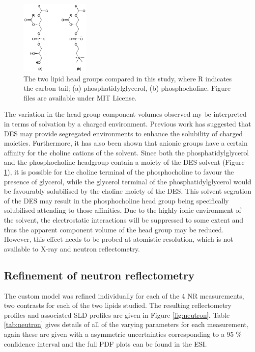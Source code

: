\documentclass[twoside,twocolumn,9pt]{article}
\begin{document}
\begin{figure}
	\centering
	\includegraphics[width=0.30\textwidth]{figures/head_groups}
	\caption{The two lipid head groups compared in this study, where R indicates the carbon tail; (a) phosphatidylglycerol, (b) phosphocholine. Figure files are available under MIT License.\cite{mccluskey_2018}}
	\label{fig:heads}
\end{figure}

The variation in the head group component volumes observed my be interpreted in terms of solvation by a charged environment. Previous work has suggested that DES may provide segregated environments to enhance the solubility of charged moieties.\cite{Bryant2017,Bryant2016,Sanchez-Fernandez2018} Furthermore, it has also been shown that anionic groups have a certain affinity for the choline cations of the solvent.\cite{Sanchez-Fernandez2016} Since both the phosphatidylglycerol and the phosphocholine headgroup contain a moiety of the DES solvent (Figure \ref{fig:heads}), it is possible for the choline terminal of the phosphocholine to favour the presence of glycerol, while the glycerol terminal of the phosphatidylglycerol would be favourably solubilised by the choline moiety of the DES. This solvent segration of the DES may result in the phosphocholine head group being specifically solubilised attending to those affinities. Due to the highly ionic environment of the solvent, the electrostatic interactions will be suppressed to some extent and thus the apparent component volume of the head group may be reduced. However, this effect needs to be probed at atomistic resolution, which is not available to X-ray and neutron reflectometry.

\subsection{Refinement of neutron reflectometry}
The custom model was refined individually for each of the 4 NR measurements, two contrasts for each of the two lipids studied. The resulting reflectometry profiles and associated SLD profiles are given in Figure \ref{fig:neutron}. Table \ref{tab:neutron} gives details of all of the varying parameters for each measurement, again these are given with a asymmetric uncertainties corresponding to a 95 \% confidence interval and the full PDF plots can be found in the ESI.
\end{document}
